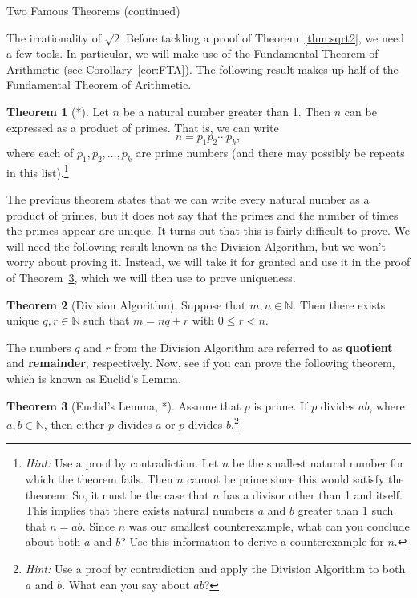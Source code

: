 \documentclass[11pt]{article}
\theoremstyle{definition}
\newtheorem{theorem}{Theorem}[section]
\begin{document}
\begin{section}{Two Famous Theorems (continued)}
\begin{subsection}{The irrationality of $\sqrt{2}$}
Before tackling a proof of Theorem~\ref{thm:sqrt2}, we need a few tools.  In particular, we will make use of the Fundamental Theorem of Arithmetic (see Corollary~\ref{cor:FTA}).  The following result makes up half of the Fundamental Theorem of Arithmetic.

\begin{theorem}[*]\label{thm:prodprimes}
Let $n$ be a natural number greater than 1.  Then $n$ can be expressed as a product of primes.  That is, we can write
\[
n=p_1 p_2 \cdots p_k,
\]
where each of $p_1, p_2, \ldots, p_k$ are prime numbers (and there may possibly be repeats in this list).\footnote{\emph{Hint:} Use a proof by contradiction.  Let $n$ be the smallest natural number for which the theorem fails.  Then $n$ cannot be prime since this would satisfy the theorem.  So, it must be the case that $n$ has a divisor other than 1 and itself.  This implies that there exists natural numbers $a$ and $b$ greater than 1 such that $n=ab$.  Since $n$ was our smallest counterexample, what can you conclude about both $a$ and $b$?  Use this information to derive a counterexample for $n$.}
\end{theorem}

The previous theorem states that we can write every natural number as a product of primes, but it does not say that the primes and the number of times the primes appear are unique.  It turns out that this is fairly difficult to prove.  We will need the following result known as the Division Algorithm, but we won't worry about proving it.  Instead, we will take it for granted and use it in the proof of Theorem~\ref{thm:Euclid}, which we will then use to prove uniqueness.

\begin{theorem}[Division Algorithm]
Suppose that $m,n\in\mathbb{N}$.  Then there exists unique $q,r\in\mathbb{N}$ such that $m=nq+r$ with $0\leq r<n$.
\end{theorem}
The numbers $q$ and $r$ from the Division Algorithm are referred to as \textbf{quotient} and \textbf{remainder}, respectively.  Now, see if you can prove the following theorem, which is known as Euclid's Lemma.

\begin{theorem}[Euclid's Lemma, *]\label{thm:Euclid}
Assume that $p$ is prime.  If $p$ divides $ab$, where $a,b\in\mathbb{N}$, then either $p$ divides $a$ or $p$ divides $b$.\footnote{\emph{Hint:} Use a proof by contradiction and apply the Division Algorithm to both $a$ and $b$.  What can you say about $ab$?}
\end{theorem}


\end{subsection}
\end{section}
\end{document}
